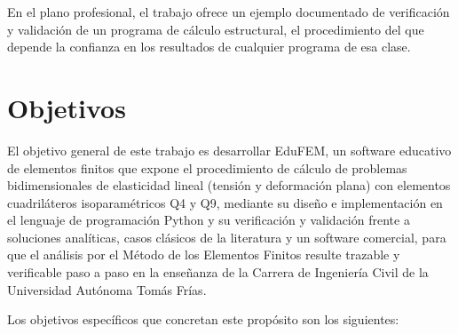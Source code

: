 En el plano profesional, el trabajo ofrece un ejemplo documentado de verificación y validación de un programa de cálculo estructural, el procedimiento del que depende la confianza en los resultados de cualquier programa de esa clase.

\section*{Objetivos}

El objetivo general de este trabajo es desarrollar EduFEM, un software educativo de elementos finitos que expone el procedimiento de cálculo de problemas bidimensionales de elasticidad lineal (tensión y deformación plana) con elementos cuadriláteros isoparamétricos Q4 y Q9, mediante su diseño e implementación en el lenguaje de programación Python y su verificación y validación frente a soluciones analíticas, casos clásicos de la literatura y un software comercial, para que el análisis por el Método de los Elementos Finitos resulte trazable y verificable paso a paso en la enseñanza de la Carrera de Ingeniería Civil de la Universidad Autónoma Tomás Frías.

Los objetivos específicos que concretan este propósito son los siguientes:

